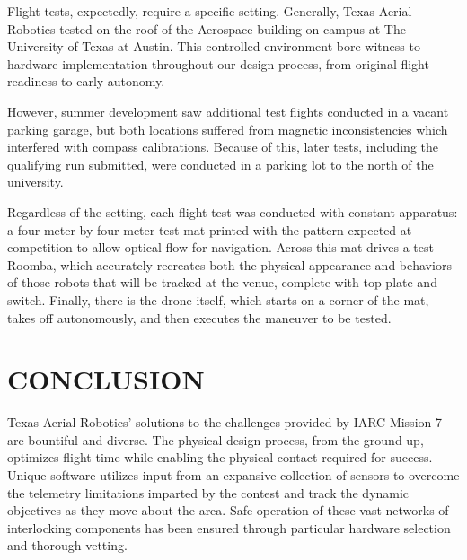 \documentclass[12pt,letterpaper]{article}
\begin{document}
		Flight tests, expectedly, require a specific setting. Generally, Texas Aerial Robotics tested on the roof of the Aerospace building on campus at The University of Texas at Austin. This controlled environment bore witness to hardware implementation throughout our design process, from original flight readiness to early autonomy.

		However, summer development saw additional test flights conducted in a vacant parking garage, but both locations suffered from magnetic inconsistencies which interfered with compass calibrations. Because of this, later tests, including the qualifying run submitted, were conducted in a parking lot to the north of the university.

		Regardless of the setting, each flight test was conducted with constant apparatus: a four meter by four meter test mat printed with the pattern expected at competition to allow optical flow for navigation. Across this mat drives a test Roomba, which accurately recreates both the physical appearance and behaviors of those robots that will be tracked at the venue, complete with top plate and switch. Finally, there is the drone itself, which starts on a corner of the mat, takes off autonomously, and then executes the maneuver to be tested.


\section*{CONCLUSION}
	Texas Aerial Robotics' solutions to the challenges provided by IARC Mission 7 are bountiful and diverse. The physical design process, from the ground up, optimizes flight time while enabling the physical contact required for success. Unique software utilizes input from an expansive collection of sensors to overcome the telemetry limitations imparted by the contest and track the dynamic objectives as they move about the area. Safe operation of these vast networks of interlocking components has been ensured through particular hardware selection and thorough vetting.
	\nocite{redmon2016yolo9000}
	\nocite{GitHubSPACEROBOTICS}
	\nocite{HoughTransform}
	\nocite{CannyEdgeDetection}
	
	
\end{document}
